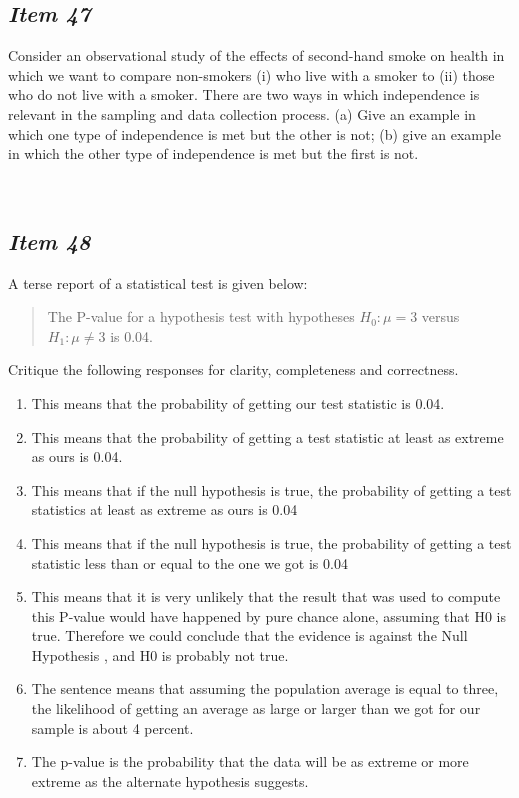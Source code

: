\subsection{\textbf{\textit{Item 47}}}

Consider an observational study of the effects of second-hand smoke on
health in which we want to compare non-smokers (i) who live with a smoker
to (ii) those who do not live with a smoker. There are two ways in which
independence is relevant in the sampling and data collection process. (a)
Give an example in which one type of independence is met but the other is
not; (b) give an example in which the other type of independence is met but
the first is not.

\ 

\subsection{\textbf{\textit{Item 48}}}

A terse report of a statistical test is given below:
\begin{quote}
The P-value for a hypothesis test with hypotheses $H_0: \mu = 3$ versus $H_1: \mu \neq 3$ is 0.04.
\end{quote}

Critique the following responses for clarity, completeness  and correctness.

\begin{enumerate} [leftmargin=1cm, itemsep=.2em]
\item This means that the probability of getting our test statistic is 0.04.

\item This means that the probability of getting a test statistic at least as extreme as ours is 0.04.

\item This means that if the null hypothesis is true, the probability of getting a test statistics at least as extreme as ours is 0.04

\item This means that if the null hypothesis is true, the probability of getting a test statistic less than or equal to the one we got is 0.04

\item This means that it is very unlikely that the result that was used to compute this P-value would have happened by pure chance alone, assuming that  H0 is true. Therefore we could conclude that the evidence is against the Null Hypothesis , and H0 is probably  not true.

\item The sentence means that assuming the population average is equal to three, the likelihood of getting an average as large or larger than we got for our sample is about 4 percent. 

\item The p-value is the probability that the data will be as extreme or more extreme as the alternate hypothesis suggests.
\end{enumerate}


